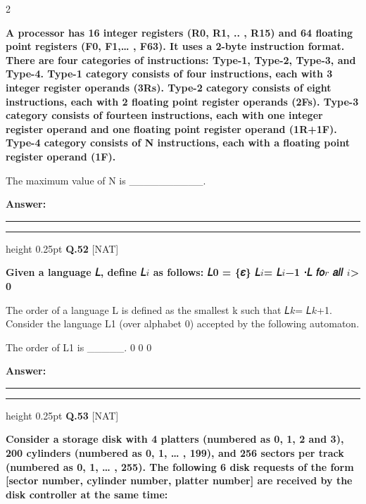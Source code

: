 \documentclass[a4paper,10pt,twoside]{article}
\begin{document}
\begin{multicols}{2}
\par\vspace{2pt}
{\bfseries A processor has 16 integer registers (R0, R1, .. , R15) and 64 floating point registers (F0,
F1,… , F63). It uses a 2-byte instruction format. There are four categories of instructions:
Type-1, Type-2, Type-3, and Type-4. Type-1 category consists of four instructions, each
with 3 integer register operands (3Rs). Type-2 category consists of eight instructions, each
with 2 floating point register operands (2Fs). Type-3 category consists of fourteen
instructions, each with one integer register operand and one floating point register operand
(1R+1F). Type-4 category consists of N instructions, each with a floating point register
operand (1F).
\par\smallskip
The maximum value of N is \_\_\_\_\_\_\_\_\_\_. \par}
\par\vspace{3pt}\noindent\textbf{Answer:} \rule{3.2cm}{0.4pt}
\par\vspace{6pt}\hrule height 0.25pt\vspace{6pt}
\noindent\textbf{Q.52} \hfill {\footnotesize\textsf{[NAT]}}
\par\vspace{2pt}
{\bfseries Given a language 𝐿, define 𝐿$i$ as follows:
𝐿0 = \{𝜀\}
𝐿$i$= 𝐿$i$−1 ⋅𝐿 𝑓𝑜$r$ 𝑎𝑙𝑙 $i$> 0
\par\smallskip
The order of a language L is defined as the smallest k such that 𝐿$k$= 𝐿$k$+1.
Consider the language L1 (over alphabet 0) accepted by the following automaton.
\par\smallskip
The order of L1 is \_\_\_\_\_.
0
0
0 \par}
\par\vspace{3pt}\noindent\textbf{Answer:} \rule{3.2cm}{0.4pt}
\par\vspace{6pt}\hrule height 0.25pt\vspace{6pt}
\noindent\textbf{Q.53} \hfill {\footnotesize\textsf{[NAT]}}
\par\vspace{2pt}
{\bfseries Consider a storage disk with 4 platters (numbered as 0, 1, 2 and 3), 200 cylinders (numbered
as 0, 1, … , 199), and 256 sectors per track (numbered as 0, 1, … , 255). The following 6
disk requests of the form [sector number, cylinder number, platter number] are received by
the disk controller at the same time:
}
\end{multicols}
\end{document}
